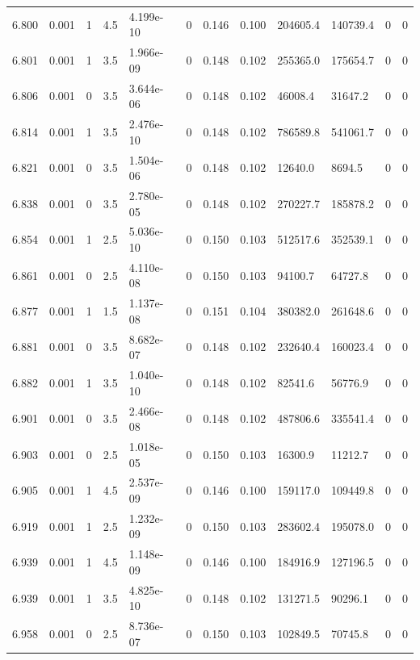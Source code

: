 \documentclass[preview]{standalone}
\begin{document}
{{{{{{{{{{{{{{{{\begin{tabular}{L{1.2cm}C{1.2cm} C{0.3cm}C{0.5cm} C{1.4cm}C{1.4cm} C{1.4cm}C{1.4cm} C{1.6cm}C{1.6cm} C{1.6cm}C{1.6cm}}
  6.800  &  0.001  & 1     & 4.5 &  4.199e-10  & 0  &  0.146&   0.100& 204605.4 & 140739.4   &  0 & 0  \\ 
  6.801  &  0.001  & 1     & 3.5 &  1.966e-09  & 0  &  0.148&   0.102& 255365.0 & 175654.7   &  0 & 0  \\ 
  6.806  &  0.001  & 0     & 3.5 &  3.644e-06  & 0  &  0.148&   0.102& 46008.4 & 31647.2   &  0 & 0  \\ 
  6.814  &  0.001  & 1     & 3.5 &  2.476e-10  & 0  &  0.148&   0.102& 786589.8 & 541061.7   &  0 & 0  \\ 
  6.821  &  0.001  & 0     & 3.5 &  1.504e-06  & 0  &  0.148&   0.102& 12640.0 & 8694.5   &  0 & 0  \\ 
  6.838  &  0.001  & 0     & 3.5 &  2.780e-05  & 0  &  0.148&   0.102& 270227.7 & 185878.2   &  0 & 0  \\ 
  6.854  &  0.001  & 1     & 2.5 &  5.036e-10  & 0  &  0.150&   0.103& 512517.6 & 352539.1   &  0 & 0  \\ 
  6.861  &  0.001  & 0     & 2.5 &  4.110e-08  & 0  &  0.150&   0.103& 94100.7 & 64727.8   &  0 & 0  \\ 
  6.877  &  0.001  & 1     & 1.5 &  1.137e-08  & 0  &  0.151&   0.104& 380382.0 & 261648.6   &  0 & 0  \\ 
  6.881  &  0.001  & 0     & 3.5 &  8.682e-07  & 0  &  0.148&   0.102& 232640.4 & 160023.4   &  0 & 0  \\ 
  6.882  &  0.001  & 1     & 3.5 &  1.040e-10  & 0  &  0.148&   0.102& 82541.6 & 56776.9   &  0 & 0  \\ 
  6.901  &  0.001  & 0     & 3.5 &  2.466e-08  & 0  &  0.148&   0.102& 487806.6 & 335541.4   &  0 & 0  \\ 
  6.903  &  0.001  & 0     & 2.5 &  1.018e-05  & 0  &  0.150&   0.103& 16300.9 & 11212.7   &  0 & 0  \\ 
  6.905  &  0.001  & 1     & 4.5 &  2.537e-09  & 0  &  0.146&   0.100& 159117.0 & 109449.8   &  0 & 0  \\ 
  6.919  &  0.001  & 1     & 2.5 &  1.232e-09  & 0  &  0.150&   0.103& 283602.4 & 195078.0   &  0 & 0  \\ 
  6.939  &  0.001  & 1     & 4.5 &  1.148e-09  & 0  &  0.146&   0.100& 184916.9 & 127196.5   &  0 & 0  \\ 
  6.939  &  0.001  & 1     & 3.5 &  4.825e-10  & 0  &  0.148&   0.102& 131271.5 & 90296.1   &  0 & 0  \\ 
  6.958  &  0.001  & 0     & 2.5 &  8.736e-07  & 0  &  0.150&   0.103& 102849.5 & 70745.8   &  0 & 0  \\ 

\end{tabular}}}}}}}}}}}}}}}}}
\end{document}
